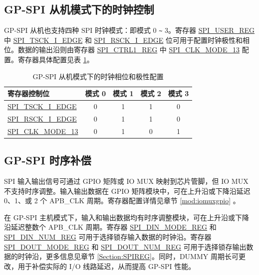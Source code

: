 \documentclass[main\_\_CN.tex]{subfiles}
\begin{document}
\subsection{GP-SPI 从机模式下的时钟控制}\label{GP-SPI2 slave clock control}

GP-SPI 从机也支持四种 SPI 时钟模式：即模式 0 \verb+~+ 3。寄存器 \hyperref[regdesc:SPIUSERREG]{SPI\_USER\_REG} 中 \hyperref[fielddesc:SPITSCKIEDGE]{SPI\_TSCK\_I\_EDGE} 和 \hyperref[fielddesc:SPIRSCKIEDGE]{SPI\_RSCK\_I\_EDGE} 位可用于配置时钟极性和相位。数据的输出沿则由寄存器 \hyperref[regdesc:SPICTRL1REG]{SPI\_CTRL1\_REG} 中 \hyperref[fielddesc:SPICLKMODE13]{SPI\_CLK\_MODE\_13} 配置。寄存器具体配置见表  \ref{table:spi_clock_pol_slave}。

\begin{table}[H]
    \centering
    \caption{GP-SPI 从机模式下的时钟相位和极性配置}
    \label{table:spi_clock_pol_slave}
    \begin{tabular}[c]{|p{3.5cm}|c|c|c|c|}
    \hline
    \rowcolor{lightgray}
    寄存器控制位  & 模式 0 & 模式 1 & 模式 2 & 模式 3\\
    \hline
    \hyperref[fielddesc:SPITSCKIEDGE]{SPI\_TSCK\_I\_EDGE}   & 0 & 1 & 1 & 0\\
    \hline
    \hyperref[fielddesc:SPIRSCKIEDGE]{SPI\_RSCK\_I\_EDGE}   & 0 & 1 & 1 & 0\\
    \hline
    \hyperref[fielddesc:SPICLKMODE13]{SPI\_CLK\_MODE\_13}     & 0 & 1 & 0 & 1\\
    \hline
    \end{tabular}
\end{table}


\subsection{GP-SPI 时序补偿} \label{subsubsection:timing-compensation}

SPI 输入输出信号可通过 GPIO 矩阵或 IO MUX 映射到芯片管脚，但 IO MUX 不支持时序调整。输入输出数据在 GPIO 矩阵模块中，可在上升沿或下降沿延迟 0、1、或 2 个 APB\_CLK 周期。寄存器配置详情见章节 \ref{mod:iomuxgpio} \textit{}。

在 GP-SPI 主机模式下，输入和输出数据均有时序调整模块，可在上升沿或下降沿延迟整数个 APB\_CLK 周期。寄存器 \hyperref[regdesc:SPIDINMODEREG]{SPI\_DIN\_MODE\_REG} 和 \hyperref[regdesc:SPIDINNUMREG]{SPI\_DIN\_NUM\_REG} 可用于选择锁存输入数据的时钟沿。寄存器 \hyperref[regdesc:SPIDOUTMODEREG]{SPI\_DOUT\_MODE\_REG} 和 \hyperref[regdesc:SPIDOUTNUMREG]{SPI\_DOUT\_NUM\_REG} 可用于选择锁存输出数据的时钟沿，更多信息见章节 \ref{Section:SPIREG}。同时，DUMMY 周期长可更改，用于补偿实际的 I/O 线路延迟，从而提高 GP-SPI 性能。
\end{document}

